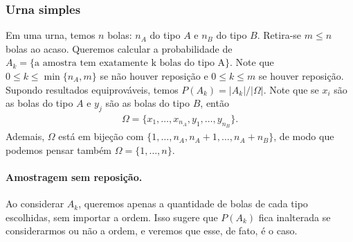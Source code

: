 \documentclass[../Notas.tex]{subfiles}
\begin{document}
\subsubsection{Urna simples}
Em uma urna, temos $n$ bolas: $n_A$ do tipo $A$ e $n_B$ do tipo $B$. Retira-se $m\leq n$ bolas ao acaso. Queremos calcular a probabilidade de $A_k = \{ \text{a amostra tem exatamente k bolas do tipo A} \}$. Note que $0\leq k\leq\min\{ n_A, m \}$ se não houver reposição e $0\leq k\leq m$ se houver reposição. Supondo resultados equiprováveis, temos $P(A_k) = |A_k|/|\Omega|$. Note que se $x_i$ são as bolas do tipo $A$ e $y_j$ são as bolas do tipo $B$, então
\begin{align*}
    \Omega = \{ x_1, \dots, x_{n_A}, y_1, \dots, y_{n_B} \}. 
\end{align*}
Ademais, $\Omega$ está em bijeção com $\{1, \dots, n_A, n_A + 1, \dots, n_A + n_B \}$, de modo que podemos pensar também $\Omega = \{ 1, \dots, n \}$.

\paragraph{Amostragem sem reposição.} Ao considerar $A_k$, queremos apenas a quantidade de bolas de cada tipo escolhidas, sem importar a ordem. Isso sugere que $P(A_k)$ fica inalterada se considerarmos ou não a ordem, e veremos que esse, de fato, é o caso. 
\end{document}
